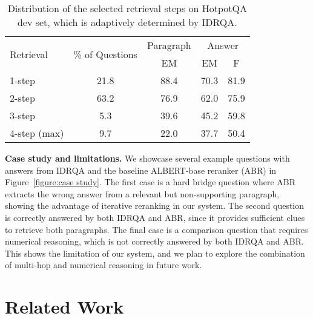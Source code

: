 \documentclass[sigconf]{acmart}
\begin{document}
\setlength\tabcolsep{6pt}
\begin{table}
\centering
\caption{Distribution of the selected retrieval steps on HotpotQA dev set, which is adaptively determined by IDRQA.}
\label{table:stats_dynamic}
\begin{tabular}{@{}lcccc@{}}
\toprule
\multirow{2}{*}{Retrieval} & \multirow{2}{*}{\% of Questions} & Paragraph & \multicolumn{2}{c}{Answer} \\ \cmidrule(l){3-5} 
 &  & EM & EM & F \\ \midrule
1-step & 21.8 & 88.4 & 70.3 & 81.9 \\
2-step & 63.2 & 76.9 & 62.0 & 75.9 \\
3-step & 5.3 & 39.6 & 45.2 & 59.8 \\
4-step (max) & 9.7 & 22.0 & 37.7 & 50.4 \\ \bottomrule
\end{tabular}
\end{table}





\BlankLine
\noindent \textbf{Case study and limitations.}
We showcase several example questions with answers from IDRQA and the baseline ALBERT-base reranker (ABR) in Figure~\ref{figure:case study}. The first case is a hard bridge question where ABR extracts the wrong answer from a relevant but non-supporting paragraph, showing the advantage of iterative reranking in our system.
The second question is correctly answered by both IDRQA and ABR, since it provides sufficient clues to retrieve both paragraphs.
The final case is a comparison question that requires numerical reasoning, which is not correctly answered by both IDRQA and ABR. This shows the limitation of our system, and we plan to explore the combination of multi-hop and numerical reasoning in future work.







\section{Related Work}
\end{document}
